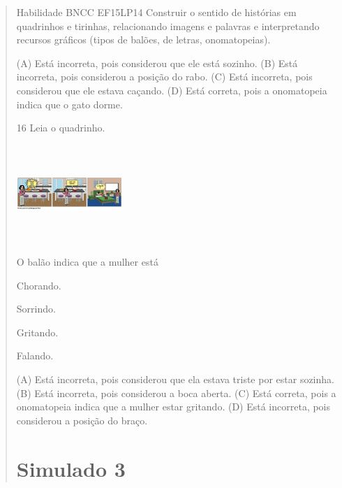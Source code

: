 \begin{verse}
{Habilidade BNCC EF15LP14 Construir o sentido de histórias em quadrinhos
e tirinhas, relacionando imagens e palavras e interpretando recursos
gráficos (tipos de balões, de letras, onomatopeias).}

(A) Está incorreta, pois considerou que ele está sozinho.
(B) Está incorreta, pois considerou a posição do rabo.
(C) Está incorreta, pois considerou que ele estava caçando.
(D) Está correta, pois a onomatopeia indica que o gato dorme.

\num{16} Leia o quadrinho.

\includegraphics[width=1.57333in,height=1.45456in]{media/image162.png}


O balão indica que a mulher está

\begin{minipage}{.5\textwidth}
\begin{escolha}
\item Chorando.

\item Sorrindo.

\item Gritando.

\item Falando.
\end{escolha}
\end{minipage}

(A) Está incorreta, pois considerou que ela estava triste por estar sozinha.
(B) Está incorreta, pois considerou a boca aberta.
(C) Está correta, pois a onomatopeia indica que a mulher estar gritando.
(D) Está incorreta, pois considerou a posição do braço.

\chapter{Simulado 3}


\end{verse}
